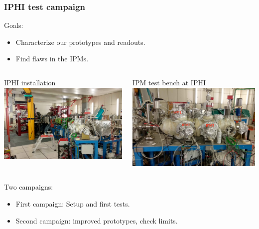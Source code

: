 \begin{frame}[t]
  \frametitle{IPHI test campaign}
  \begin{block}{Goals:}
    \begin{itemize}
      \item Characterize our prototypes and readouts.
      \item Find flaws in the IPMs.
    \end{itemize}
  \end{block}
  \begin{columns}[T]
    \begin{column}{0.45\textwidth}
      \centering
      IPHI installation
      \includegraphics[width=1\textwidth]{04_Test/fig/fig000_IPHI_tb1.jpg}
    \end{column}
    \begin{column}{0.45\textwidth}
      \centering
      IPM test bench at IPHI
      \includegraphics[width=1\textwidth]{04_Test/fig/fig000_IPHI_tb2.jpg}
    \end{column}
  \end{columns}
  \begin{block}{Two campaigns:}
    \begin{itemize}
      \item First campaign: Setup and first tests.
      \item Second campaign: improved prototypes, check limits.
    \end{itemize}
  \end{block}
\end{frame}

